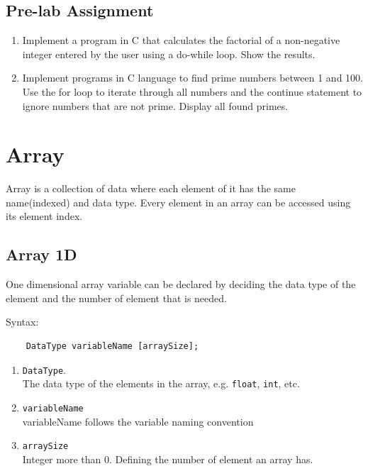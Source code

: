 \subsection{Pre-lab Assignment}
\begin{enumerate}
	\item Implement a program in C that calculates the factorial of a non-negative integer entered by the user using a do-while loop. Show the results.
	\item Implement programs in C language to find prime numbers between 1 and 100. Use the for loop to iterate through all numbers and the continue statement to ignore numbers that are not prime. Display all found primes.
\end{enumerate}

\section{Array}
Array is a collection of data where each element of it has the same name(indexed) and data type. Every element in an array can be accessed using its element index.
\subsection{Array 1D}
One dimensional array variable can be declared by deciding the data type of the element and the number of element that is needed.

Syntax:
\begin{verbatim}
    DataType variableName [arraySize];
\end{verbatim}
\begin{enumerate}
	\item \verb*|DataType|.\\
    The data type of the elements in the array, e.g. \verb|float|, \verb|int|, etc.
	\item \verb*|variableName|\\
    variableName follows the variable naming convention
	
	\item \verb*|arraySize| \\
    Integer more than 0. Defining the number of element an array has.
\end{enumerate}

